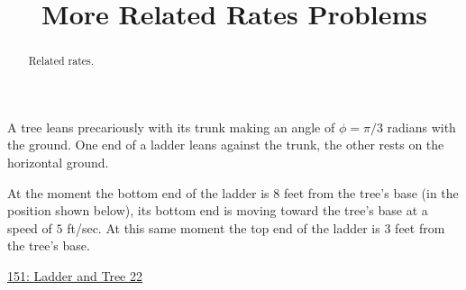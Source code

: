 \documentclass{ximera}
\title{More Related Rates Problems}
\begin{document}
\begin{abstract}
Related rates.
\end{abstract}
\maketitle


\begin{question}  \label{Q34fdffffhggg}
A tree leans precariously with its trunk making an angle of $\phi = \pi/3$ radians with the ground. One end of a ladder leans against the trunk, the other rests on the horizontal ground.

At the moment the bottom end of the ladder is $8$ feet from the tree's base (in the position shown below), its bottom end is moving toward the tree's base at a speed of $5$ ft/sec. At this same moment the top end of the ladder is $3$ feet from the tree's base.

 
\begin{onlineOnly}
   \begin{center}
\end{center}
\end{onlineOnly}

\href{https://www.desmos.com/calculator/oftz4vb9qj}{151: Ladder and Tree 22}

\end{question}
\end{document}
